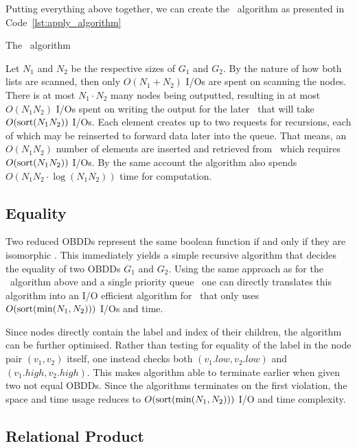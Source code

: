 \begin{lstfloat}[ht!]
  \centering

  

  \caption{Construction of to-be-outputted node \lstinline{v'} and recursing
    using \ApplyQrec.}
  \label{lst:apply_recurse_node}
\end{lstfloat}

Putting everything above together, we can create the \Apply\ algorithm as
presented in Code~\ref{lst:apply_algorithm}

\begin{lstfloat}[ht!]
  \centering

  

  \caption{The \Apply\ algorithm}
  \label{lst:apply_algorithm}
\end{lstfloat}

\clearpage
Let $N_1$ and $N_2$ be the respective sizes of $G_1$ and $G_2$. By the nature of
how both lists are scanned, then only $O(N_1 + N_2)$ I/Os are spent on scanning
the nodes. There is at most $N_1 \cdot N_2$ many nodes being outputted,
resulting in at most $O(N_1 N_2)$ I/Os spent on writing the output for the later
\Reduce\ that will take $O(\text{sort}(N_1 N_2))$ I/Os. Each element creates up to two
requests for recursions, each of which may be reinserted to forward data later
into the queue. That means, an $O(N_1 N_2)$ number of elements are inserted and
retrieved from \ApplyQrec\ which requires $O(\text{sort}(N_1 N_2))$ I/Os. By the same
account the algorithm also spends $O(N_1 N_2 \cdot \log (N_1 N_2))$ time for
computation. \cite{Arge96}

\subsection{Equality} \label{sec:theory__equal}
Two reduced OBDDs represent the same boolean function if and only if they are
isomorphic \cite[Theorem 1]{Bryant86}. This immediately yields a simple
recursive algorithm that decides the equality of two OBDDs $G_1$ and $G_2$.
Using the same approach as for the \Apply\ algorithm above and a single priority
queue \EqualQrec\, one can directly translates this algorithm into an I/O
efficient algorithm for \Equal\ that only uses $O(\text{sort}(\min(N_1, N_2)))$ I/Os and
time.

Since nodes directly contain the label and index of their children, the
algorithm can be further optimised. Rather than testing for equality of the
label in the node pair $(v_1,v_2)$ itself, one instead checks both
$(v_1.\mathit{low}, v_2.\mathit{low})$ and $(v_1.\mathit{high},
v_2.\mathit{high})$. This makes algorithm able to terminate earlier when given
two not equal OBDDs. Since the algorithms terminates on the first violation, the
space and time usage reduces to $O(\text{sort}(\min(N_1, N_2)))$ I/O and time
complexity.

\subsection{Relational Product} \label{sec:theory__relational_product}


